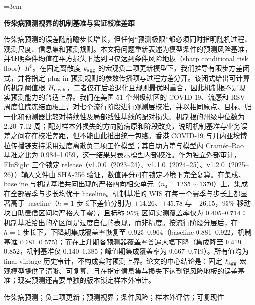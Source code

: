 \documentclass[11pt,a4paper]{article}
\begin{document}
\emergencystretch=3em

\begin{center}
 {\heiti\bfseries 传染病预测视界的机制基准与实证校准差距}
\end{center}

传染病预测的误差随前瞻步长增长，但任何“预测极限”都必须同时指明随机过程、观测尺度、信息集和预测规则。本文将问题重新表述为模型条件的预测风险基准，并证明条件均值在平方损失下达到且仅达到条件风险地板（sharp conditional risk floor）$H_\tau^\sharp$。在固定离散度 $k_{\rm agg}$ 的宏观负二项更新模型下，我们推导有限步方差闭式，并将指定 plug-in 预测规则的参数传播项与过程方差分开。该闭式给出可计算的机制阈值根 $H_{\rm mech}$，二者仅在后验退化且规则最优时重合，因此机制根不是现实预测能力的普适上界。我们在美国 51 个州级辖区的 COVID-19、流感和 RSV 周度住院冻结面板上，对七个流行阶段进行观测层校准，并以相同原点、目标、归一化和预测器比较对持续性及局部线性基线的配对损失。机制根的州级中位数为 2.20--7.12 周；配对样本外损失的方向随病原和阶段改变，说明机制基准与业务误差之间存在校准差距，但不能由此推出统一包络。香港 COVID-19 与几内亚埃博拉传播链支持采用过度离散负二项工作模型；其自助方差与模型内 Cram\'er--Rao 基准之比为 0.984--1.059，这一结果只表示模型内部校准。作为独立外部审计，FluSight 三个锁定 release（v1.0.0（2023--24）、v1.1.0（2024--25）、v1.2.0（2025--26））输入文件由 SHA-256 验证，数值评分可在锁定环境下完全复算。在集成、baseline 与机制基准共同出现的严格四向相交单元（$n_4=1235\sim 1376$）上，集成在全部赛季与步长均优于 baseline。机制基准的 WIS 在每一个赛季与步长上都显著高于 baseline（$h=1$ 步长下差值分别为 $+14.26$、$+45.78$ 与 $+26.15$，95\% 移动块自助置信区间均严格大于零），且标称 95\% 区间实测覆盖率仅为 0.405--0.714：机制基准给出的窄区间是过度自信的表现，而非精度。按流行阶段分层后，在 $h=1$ 步长下，下降期集成覆盖率恢复至 0.925--0.964（baseline 0.881--0.922，机制基准 0.381--0.575）；而在上升期各预测器覆盖率普遍大幅下降（集成降至 0.419--0.852，机制基准仅 0.140--0.385；峰值期集成覆盖率为 0.667--0.719）。所有值均为 final-vintage 历史审计，不构成实时预测上界。论文的中心结论是：固定 $k_{\rm agg}$ 宏观模型提供了清晰、可复算、且在指定信息集与损失下达到锐风险地板的误差基准；现实预测还需要单独的版本锁定样本外审计。

\vspace{0.6em}
传染病预测；负二项更新；预测视界；条件风险；样本外评估；可复现性
\end{document}
